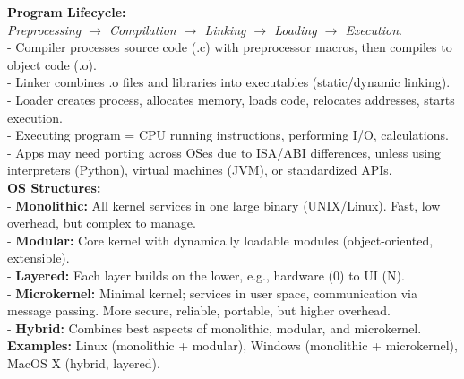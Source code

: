 \textbf{Program Lifecycle:} \\
\textit{Preprocessing $\rightarrow$ Compilation $\rightarrow$ Linking $\rightarrow$ Loading $\rightarrow$ Execution}. \\
- Compiler processes source code (.c) with preprocessor macros, then compiles to object code (.o). \\
- Linker combines .o files and libraries into executables (static/dynamic linking). \\
- Loader creates process, allocates memory, loads code, relocates addresses, starts execution. \\
- Executing program = CPU running instructions, performing I/O, calculations. \\
- Apps may need porting across OSes due to ISA/ABI differences, unless using interpreters (Python), virtual machines (JVM), or standardized APIs. \\

\textbf{OS Structures:} \\
- \textbf{Monolithic:} All kernel services in one large binary (UNIX/Linux). Fast, low overhead, but complex to manage. \\
- \textbf{Modular:} Core kernel with dynamically loadable modules (object-oriented, extensible). \\
- \textbf{Layered:} Each layer builds on the lower, e.g., hardware (0) to UI (N). \\
- \textbf{Microkernel:} Minimal kernel; services in user space, communication via message passing. More secure, reliable, portable, but higher overhead. \\
- \textbf{Hybrid:} Combines best aspects of monolithic, modular, and microkernel. \\
\textbf{Examples:} Linux (monolithic + modular), Windows (monolithic + microkernel), MacOS X (hybrid, layered). \\